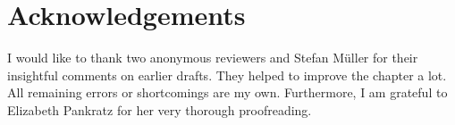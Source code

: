 \documentclass[output=paper
                ,modfonts
                ,nonflat
	        ,collection
	        ,collectionchapter
	        ,collectiontoclongg
 	        ,biblatex
                ,babelshorthands
                ,newtxmath
                ,draftmode
                ,colorlinks, citecolor=brown
]{./langsci/langscibook}
\begin{document}
\section*{Acknowledgements}


I would like to thank two anonymous reviewers and Stefan Müller for
their insightful comments on earlier drafts. They helped to improve
the chapter a lot. All remaining errors or
shortcomings are my own. Furthermore, I am grateful to Elizabeth
Pankratz for her very thorough proofreading.



\printbibliography[heading=subbibliography,notkeyword=this] 
\end{document}
